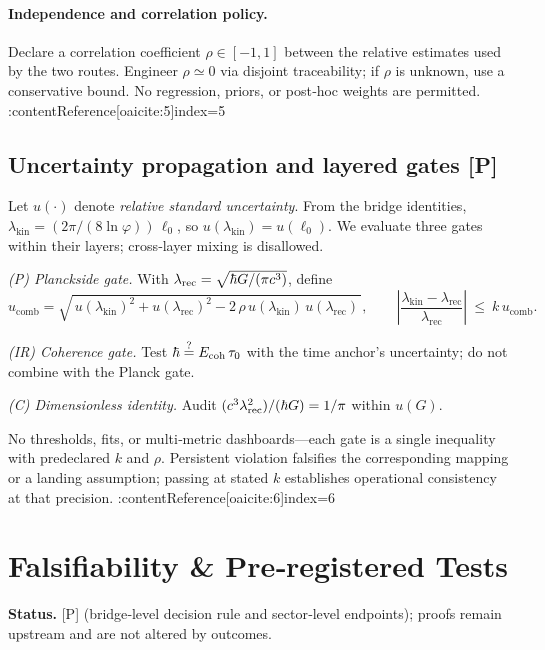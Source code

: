 \documentclass[11pt]{article}
\begin{document}
\paragraph{Independence and correlation policy.}
Declare a correlation coefficient \(\rho\in[-1,1]\) between the relative estimates used by the two routes. Engineer \(\rho\simeq 0\) via disjoint traceability; if \(\rho\) is unknown, use a conservative bound. No regression, priors, or post‑hoc weights are permitted. :contentReference[oaicite:5]{index=5}

\subsection*{Uncertainty propagation and layered gates [P]}
Let \(u(\cdot)\) denote \emph{relative standard uncertainty}. From the bridge identities, \(\lambda_{\mathrm{kin}}=(2\pi/(8\ln\varphi))\,\ell_{0}\), so \(u(\lambda_{\mathrm{kin}})=u(\ell_{0})\). We evaluate three gates within their layers; cross‑layer mixing is disallowed.

\emph{(P) Planck\-side gate.} With \(\lambda_{\rm rec}=\sqrt{\hbar G/(\pi c^{3})}\), define
\[
 u_{\mathrm{comb}}=\sqrt{\,u(\lambda_{\mathrm{kin}})^{2}+u(\lambda_{\mathrm{rec}})^{2}-2\,\rho\,u(\lambda_{\mathrm{kin}})\,u(\lambda_{\mathrm{rec}})\,},\qquad
 \left|\frac{\lambda_{\mathrm{kin}}-\lambda_{\mathrm{rec}}}{\lambda_{\mathrm{rec}}}\right|\ \le\ k\,u_{\mathrm{comb}}.
\]

\emph{(IR) Coherence gate.} Test \(\hbar\overset{?}{=}E_{\rm coh}\,\tau_0\) with the time anchor’s uncertainty; do not combine with the Planck gate.

\emph{(C) Dimensionless identity.} Audit \((c^{3}\lambda_{\rm rec}^{2})/(\hbar G)=1/\pi\) within \(u(G)\).

No thresholds, fits, or multi‑metric dashboards—each gate is a single inequality with predeclared \(k\) and \(\rho\). Persistent violation falsifies the corresponding mapping or a landing assumption; passing at stated \(k\) establishes operational consistency at that precision. :contentReference[oaicite:6]{index=6}

\section{Falsifiability \& Pre‑registered Tests}\label{sec:falsifiability}

\noindent\textbf{Status.} [P] (bridge‑level decision rule and sector‑level endpoints); proofs remain upstream and are not altered by outcomes.
\end{document}
